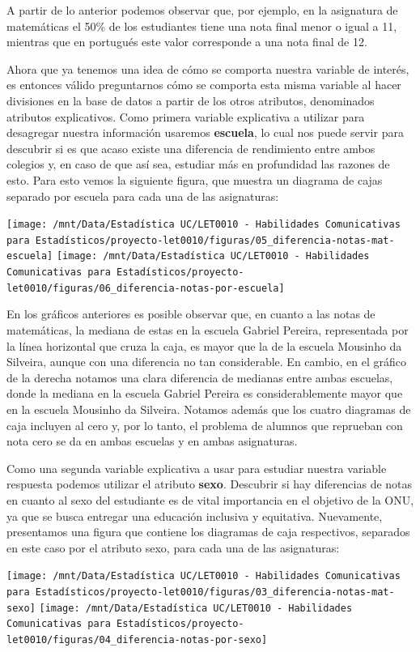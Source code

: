 \documentclass[
]{article}
\begin{document}
A partir de lo anterior podemos observar que, por ejemplo, en la
asignatura de matemáticas el 50\% de los estudiantes tiene una nota
final menor o igual a 11, mientras que en portugués este valor
corresponde a una nota final de 12.

Ahora que ya tenemos una idea de cómo se comporta nuestra variable de
interés, es entonces válido preguntarnos cómo se comporta esta misma
variable al hacer divisiones en la base de datos a partir de los otros
atributos, denominados atributos explicativos. Como primera variable
explicativa a utilizar para desagregar nuestra información usaremos
\textbf{escuela}, lo cual nos puede servir para descubrir si es que
acaso existe una diferencia de rendimiento entre ambos colegios y, en
caso de que así sea, estudiar más en profundidad las razones de esto.
Para esto vemos la siguiente figura, que muestra un diagrama de cajas
separado por escuela para cada una de las asignaturas:

\texttt{[image: /mnt/Data/Estadística UC/LET0010 - Habilidades Comunicativas para Estadísticos/proyecto-let0010/figuras/05\_diferencia-notas-mat-escuela]}
\texttt{[image: /mnt/Data/Estadística UC/LET0010 - Habilidades Comunicativas para Estadísticos/proyecto-let0010/figuras/06\_diferencia-notas-por-escuela]}

En los gráficos anteriores es posible observar que, en cuanto a las
notas de matemáticas, la mediana de estas en la escuela Gabriel Pereira,
representada por la línea horizontal que cruza la caja, es mayor que la
de la escuela Mousinho da Silveira, aunque con una diferencia no tan
considerable. En cambio, en el gráfico de la derecha notamos una clara
diferencia de medianas entre ambas escuelas, donde la mediana en la
escuela Gabriel Pereira es considerablemente mayor que en la escuela
Mousinho da Silveira. Notamos además que los cuatro diagramas de caja
incluyen al cero y, por lo tanto, el problema de alumnos que reprueban
con nota cero se da en ambas escuelas y en ambas asignaturas.

Como una segunda variable explicativa a usar para estudiar nuestra
variable respuesta podemos utilizar el atributo \textbf{sexo}. Descubrir
si hay diferencias de notas en cuanto al sexo del estudiante es de vital
importancia en el objetivo de la ONU, ya que se busca entregar una
educación inclusiva y equitativa. Nuevamente, presentamos una figura que
contiene los diagramas de caja respectivos, separados en este caso por
el atributo sexo, para cada una de las asignaturas:

\texttt{[image: /mnt/Data/Estadística UC/LET0010 - Habilidades Comunicativas para Estadísticos/proyecto-let0010/figuras/03\_diferencia-notas-mat-sexo]}
\texttt{[image: /mnt/Data/Estadística UC/LET0010 - Habilidades Comunicativas para Estadísticos/proyecto-let0010/figuras/04\_diferencia-notas-por-sexo]}
\end{document}
